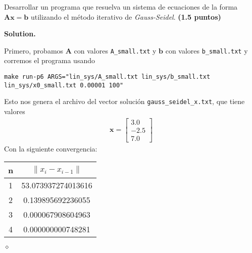 \documentclass{article}
\theoremstyle{problemstyle}
\newenvironment{solution}{%
  \begin{mdframed}[linewidth=0.8pt,linecolor=Gray,backgroundcolor=Gray!5,roundcorner=5pt]%
  \noindent\textbf{Solution.}%
}{%
\hfill $ \diamond $ 
  \end{mdframed}%
}
\begin{document}
\begin{problem}
Desarrollar un programa que resuelva un sistema de ecuaciones de la forma $
	\mathbf{Ax} = \mathbf{b} $ utilizando el método iterativo de
\textit{Gauss-Seidel}. \textbf{(1.5 puntos)}
\end{problem}

\begin{solution}
	Primero, probamos $ \mathbf{A} $ con valores \texttt{A\_small.txt} y $ \mathbf{b} $ con valores \texttt{b\_small.txt} y corremos el programa usando
	\begin{center}
		\texttt{make run-p6 ARGS="lin\_sys/A\_small.txt lin\_sys/b\_small.txt lin\_sys/x0\_small.txt 0.00001 100"}
	\end{center}
	Esto nos genera el archivo del vector soluci\'on \texttt{gauss\_seidel\_x.txt}, que tiene valores
	\begin{align*}
		\mathbf{x} =
		\begin{bmatrix}
			3.0  \\
			-2.5 \\
			7.0
		\end{bmatrix}
	\end{align*}
	Con la siguiente convergencia:
	\begin{table}[H]
		\begin{center}
			\begin{tabular}[H]{c|c}
				n & $ \lVert x_i - x_{i-1}\rVert $ \\
				\hline
				1 & 53.073937274013616             \\
				2 & 0.139895692236055              \\
				3 & 0.000067908604963              \\
				4 & 0.000000000748281
			\end{tabular}
		\end{center}
	\end{table}


\end{solution}
\end{document}
